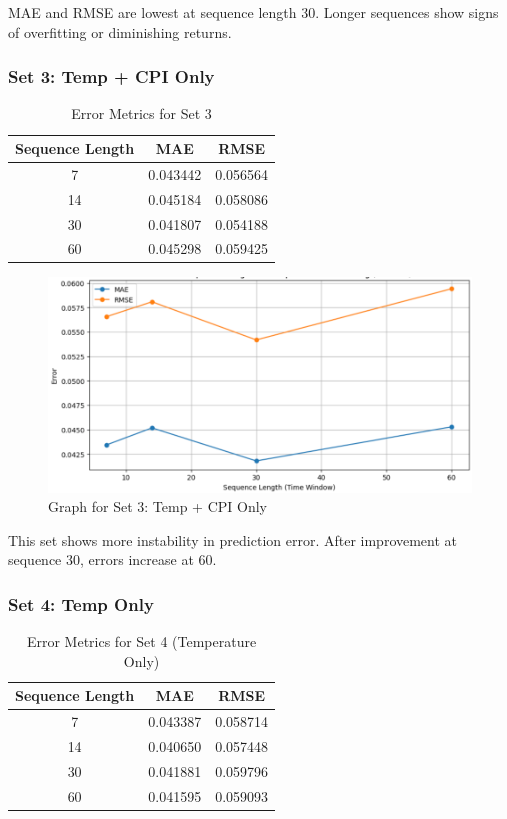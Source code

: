 \documentclass[conference]{IEEEtran}
\begin{document}
MAE and RMSE are lowest at sequence length 30. Longer sequences show signs of overfitting or diminishing returns.

\subsubsection{Set 3: Temp + CPI Only}

\begin{table}[htbp]
\centering
\begin{tabular}{|c|c|c|}
\hline
Sequence Length & MAE & RMSE \\
\hline
7 & 0.043442 & 0.056564 \\
14 & 0.045184 & 0.058086 \\
30 & 0.041807 & 0.054188 \\
60 & 0.045298 & 0.059425 \\
\hline
\end{tabular}
\caption{Error Metrics for Set 3}
\label{tab:set3}
\end{table}

\begin{figure}[H]
\centering
\includegraphics[width=0.95\linewidth]{set3.png}
\caption{Graph for Set 3: Temp + CPI Only}
\label{fig:set3}
\end{figure}

This set shows more instability in prediction error. After improvement at sequence 30, errors increase at 60.

\subsubsection{Set 4: Temp Only}

\begin{table}[htbp]
\centering
\begin{tabular}{|c|c|c|}
\hline
Sequence Length & MAE & RMSE \\
\hline
7 & 0.043387 & 0.058714 \\
14 & 0.040650 & 0.057448 \\
30 & 0.041881 & 0.059796 \\
60 & 0.041595 & 0.059093 \\
\hline
\end{tabular}
\caption{Error Metrics for Set 4 (Temperature Only)}
\label{tab:set4}
\end{table}
\end{document}
